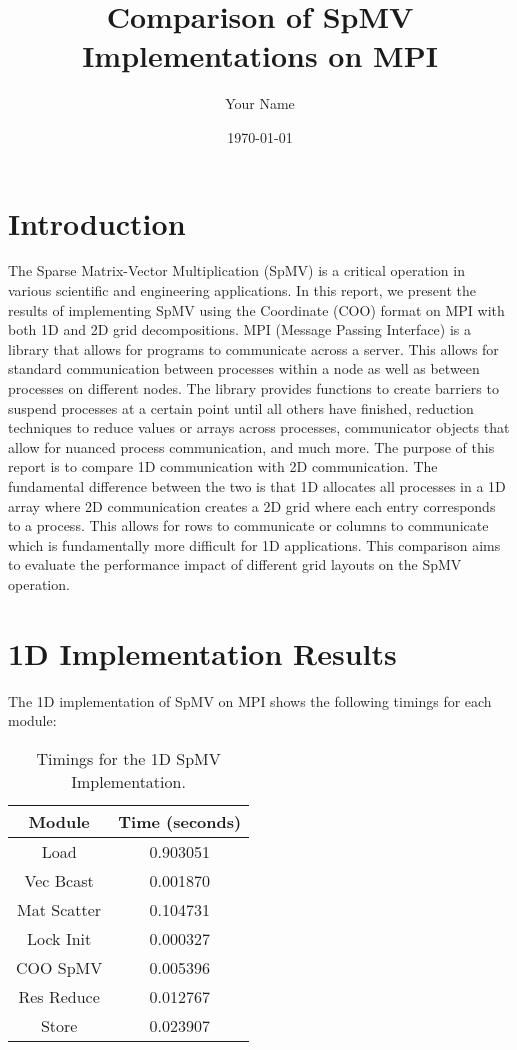 \documentclass{article}
\title{Comparison of SpMV Implementations on MPI}
\author{Your Name}
\date{\today}
\begin{document}
\maketitle

\section{Introduction}
The Sparse Matrix-Vector Multiplication (SpMV) is a critical operation in various scientific and engineering applications. In this report, we present the results of implementing SpMV using the Coordinate (COO) format on MPI with both 1D and 2D grid decompositions. MPI (Message Passing Interface) is a library that allows for programs to communicate across a server. This allows for standard communication between processes within a node as well as between processes on different nodes. The library provides functions to create barriers to suspend processes at a certain point until all others have finished, reduction techniques to reduce values or arrays across processes, communicator objects that allow for nuanced process communication, and much more. The purpose of this report is to compare 1D communication with 2D communication. The fundamental difference between the two is that 1D allocates all processes in a 1D array where 2D communication creates a 2D grid where each entry corresponds to a process. This allows for rows to communicate or columns to communicate which is fundamentally more difficult for 1D applications. This comparison aims to evaluate the performance impact of different grid layouts on the SpMV operation.

\section{1D Implementation Results}
The 1D implementation of SpMV on MPI shows the following timings for each module:

\begin{table}[h!]
\centering
\begin{tabular}{|c|c|}
\hline
\textbf{Module} & \textbf{Time (seconds)} \\
\hline
Load & 0.903051 \\
Vec Bcast & 0.001870 \\
Mat Scatter & 0.104731 \\
Lock Init & 0.000327 \\
COO SpMV & 0.005396 \\
Res Reduce & 0.012767 \\
Store & 0.023907 \\
\hline
\end{tabular}
\caption{Timings for the 1D SpMV Implementation.}
\label{tab:1d_results}
\end{table}
\\
\end{document}
